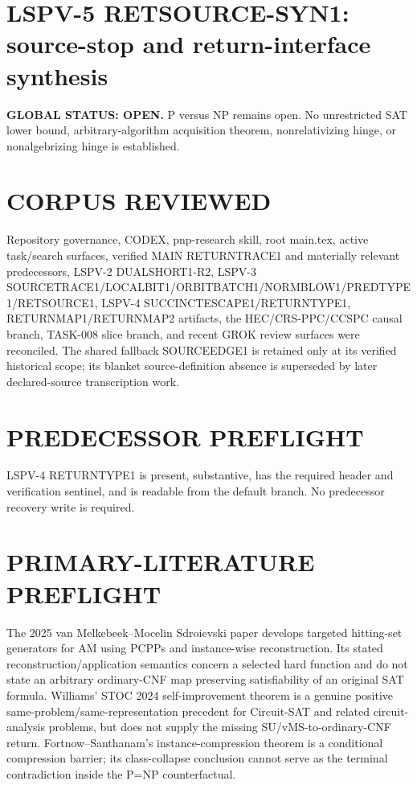 \documentclass[11pt]{article}
\begin{document}
\section*{LSPV-5 RETSOURCE-SYN1: source-stop and return-interface synthesis}
\textbf{GLOBAL STATUS: OPEN.} P versus NP remains open. No unrestricted SAT lower bound, arbitrary-algorithm acquisition theorem, nonrelativizing hinge, or nonalgebrizing hinge is established.

\section*{CORPUS REVIEWED}
Repository governance, CODEX, pnp-research skill, root main.tex, active task/search surfaces, verified MAIN RETURNTRACE1 and materially relevant predecessors, LSPV-2 DUALSHORT1-R2, LSPV-3 SOURCETRACE1/LOCALBIT1/ORBITBATCH1/NORMBLOW1/PREDTYPE1/RETSOURCE1, LSPV-4 SUCCINCTESCAPE1/RETURNTYPE1, RETURNMAP1/RETURNMAP2 artifacts, the HEC/CRS-PPC/CCSPC causal branch, TASK-008 slice branch, and recent GROK review surfaces were reconciled. The shared fallback SOURCEEDGE1 is retained only at its verified historical scope; its blanket source-definition absence is superseded by later declared-source transcription work.

\section*{PREDECESSOR PREFLIGHT}
LSPV-4 RETURNTYPE1 is present, substantive, has the required header and verification sentinel, and is readable from the default branch. No predecessor recovery write is required.

\section*{PRIMARY-LITERATURE PREFLIGHT}
The 2025 van Melkebeek--Mocelin Sdroievski paper develops targeted hitting-set generators for AM using PCPPs and instance-wise reconstruction. Its stated reconstruction/application semantics concern a selected hard function and do not state an arbitrary ordinary-CNF map preserving satisfiability of an original SAT formula. Williams' STOC 2024 self-improvement theorem is a genuine positive same-problem/same-representation precedent for Circuit-SAT and related circuit-analysis problems, but does not supply the missing SU/vMS-to-ordinary-CNF return. Fortnow--Santhanam's instance-compression theorem is a conditional compression barrier; its class-collapse conclusion cannot serve as the terminal contradiction inside the P=NP counterfactual.
\end{document}
